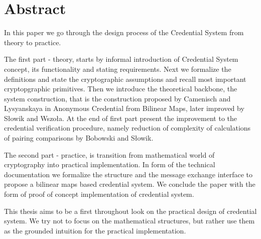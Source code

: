 \chapter*{Abstract}
\thispagestyle{chapterBeginStyle}

In this paper we go through the design process of the Credential System from theory to practice. 

The first part - theory, starts by informal introduction of Credential System concept, its functionality and stating requirements. Next we formalize the definitions and state the cryptographic assumptions and recall most important cryptopgraphic primitives. Then we introduce the theoretical backbone, the system construction, that is the construction proposed by Camenisch and Lysyanskaya in Anonymous Credential from Bilinear Maps, later improved by Słowik and Wszoła. At the end of first part present the improvement to the credential verification procedure, namely reduction of complexity of calculations of pairing comparisons by Bobowski and Słowik.

The second part - practice, is transition from mathematical world of cryptography into practical implementation. In form of the technical documentation we formalize the structure and the message exchange interface to propose a bilinear maps based credential system. We conclude the paper with the form of proof of concept implementation of credential system.

This thesis aims to be a first throughout look on the practical design of credential system. We try not to focus on the mathematical structures, but rather use them as the grounded intuition for the practical implementation.
